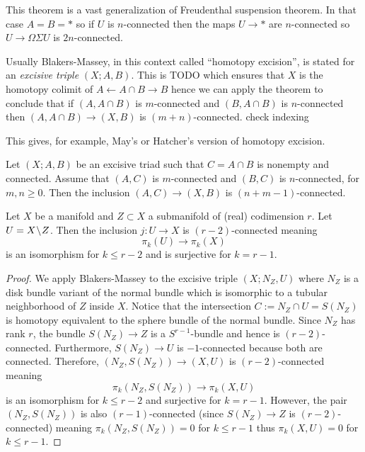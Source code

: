 \documentclass[12pt]{article}
\begin{document}
\begin{rmk}
This theorem is a vast generalization of Freudenthal suspension theorem. In that case $A = B = *$ so if $U$ is $n$-connected then the maps $U \to *$ are $n$-connected so $U \to \Omega \Sigma U$ is $2n$-connected.
\end{rmk}

\begin{rmk}
Usually Blakers-Massey, in this context called ``homotopy excision'', is stated for an \textit{excisive triple} $(X; A, B)$. This is {\color{red} TODO} which ensures that $X$ is the homotopy colimit of $A \leftarrow A \cap B \to B$ hence we can apply the theorem to conclude that if $(A, A \cap B)$ is $m$-connected and $(B, A \cap B)$ is $n$-connected then $(A, A \cap B) \to (X, B)$ is $(m+n)$-connected. {\color{red} check indexing}
\end{rmk}

This gives, for example, May's or Hatcher's version of homotopy excision.

\begin{theorem}
Let $(X; A,B)$ be an excisive triad such that $C = A \cap B$ is nonempty and connected. Assume that $(A,C)$ is $m$-connected and $(B,C)$ is $n$-connected, for $m, n \ge 0$. Then the inclusion $(A, C) \to (X,B)$ is $(n+m-1)$-connected.
\end{theorem}

\begin{prop}
Let $X$ be a manifold and $Z \subset X$ a submanifold of (real) codimension $r$. Let $U = X \! \setminus \! Z$. Then the inclusion $j : U \to X$ is $(r-2)$-connected meaning 
\[ \pi_k(U) \to \pi_k(X) \]
is an isomorphism for $k \le r-2$ and is surjective for $k = r - 1$.
\end{prop}

\begin{proof}
We apply Blakers-Massey to the excisive triple $(X; N_Z, U)$ where $N_Z$ is a disk bundle variant of the normal bundle which is isomorphic to a tubular neighborhood of $Z$ inside $X$. Notice that the intersection $C := N_Z \cap U = S(N_Z)$ is homotopy equivalent to the sphere bundle of the normal bundle. Since $N_Z$ has rank $r$, the bundle $S(N_Z) \to Z$ is a $S^{r-1}$-bundle and hence is $(r-2)$-connected. Furthermore, $S(N_Z) \to U$ is $-1$-connected because both are connected. Therefore, $(N_Z, S(N_Z)) \to (X, U)$ is $(r-2)$-connected meaning
\[ \pi_k(N_Z, S(N_Z)) \to \pi_k(X,U) \]
is an isomorphism for $k \le r - 2$ and surjective for $k = r - 1$. However, the pair $(N_Z, S(N_Z))$ is also $(r-1)$-connected (since $S(N_Z) \to Z$ is $(r-2)$-connected) meaning $\pi_k(N_Z, S(N_Z)) = 0$ for $k \le r - 1$ thus $\pi_k(X, U) = 0$ for $k \le r - 1$.  
\end{proof}
\end{document}
